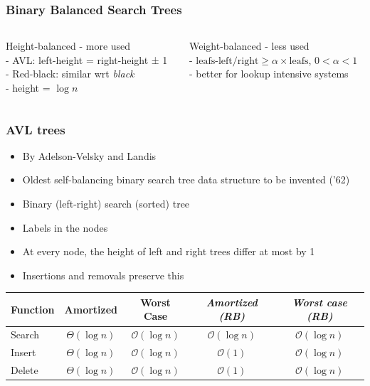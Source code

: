 \documentclass[aspectratio=169]{beamer}
\begin{document}
\begin{frame}\frametitle{Binary Balanced Search Trees}

  \begin{columns}[t]
  \begin{column}{0.48\textwidth}
    \begin{alertblock}{Height-balanced}
      - more used
      \\- AVL: left-height = right-height ± 1
      \\- Red-black: similar wrt \emph{black}
      \\- height = $\log n$
    \end{alertblock}      
  \end{column}    
  \begin{column}{0.48\textwidth}
    \begin{block}{Weight-balanced}
      - less used
      \\- $\text{leafs-left/right} \geq \alpha \times \text{leafs}$, $0<\alpha<1$
      \\- better for lookup intensive systems
    \end{block}      
  \end{column}    
  \end{columns} 
\end{frame}


\newcommand{\notyet}[1]{\textcolor{black!40}{\textit{#1}}}

\begin{frame}\frametitle{AVL trees}
\centering

\begin{itemize}
  \item By Adelson-Velsky and Landis
  \item Oldest self-balancing binary search tree data structure to be invented ('62)
  \item Binary (left-right) search (sorted) tree
  \item Labels in the nodes
  \item At every node, the \alert{height of left and right trees differ at most by 1}
  \item Insertions and removals preserve this
\end{itemize}



\begin{tabular}{lcc@{~~~}cc}
\toprule
Function &  Amortized & Worst Case
 & \notyet{Amortized (RB)} & \notyet{Worst case (RB)}
\\\midrule
Search     & ${\Theta(\log n)}$ & ${\mathcal{O}(\log n)}$
           & \notyet{${\mathcal{O}(\log n)}$} & \notyet{${\mathcal{O}(\log n)}$}\\
Insert     & ${\Theta(\log n)}$ & ${\mathcal{O}(\log n)}$
           & \notyet{${\mathcal{O}(1)}$} & \notyet{${\mathcal{O}(\log n)}$}\\
Delete     & ${\Theta(\log n)}$ & ${\mathcal{O}(\log n)}$
           & \notyet{${\mathcal{O}(1)}$} & \notyet{${\mathcal{O}(\log n)}$}\\
\bottomrule
\end{tabular}
\end{frame}
\end{document}
